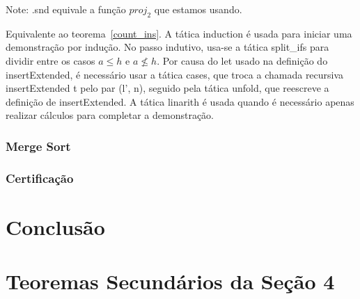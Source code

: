 \documentclass[12pt, oneside, a4paper,english,brazil]{abntex2}
\begin{document}
Note: \textsf{.snd} equivale a fun\c{c}\~ao $proj_{2}$ que estamos usando.

Equivalente ao teorema~\ref{count_ins}. A t\'atica \textsf{induction} \'e usada
 para iniciar uma demonstra\c{c}\~ao por indu\c{c}\~ao. No passo indutivo,
usa-se a t\'atica
\textsf{split\_ifs} para dividir entre os casos \textsf{$a \le h$} e \textsf{$a
\not \le h$}. Por causa do \textsf{let} usado na defini\c{c}\~ao do
\textsf{insertExtended}, \'e necess\'ario usar a t\'atica \textsf{cases},
que troca a chamada recursiva \textsf{insertExtended t} pelo par \textsf{(l',
  n)}, seguido pela t\'atica \textsf{unfold}, que reescreve a defini\c{c}\~ao de
\textsf{insertExtended}. A t\'atica \textsf{linarith} \'e usada quando \'e necess\'ario apenas realizar c\'alculos para completar a demonstra\c{c}\~ao.

\subsection{Merge Sort}

\subsection{Certifica\c{c}\~ao}

\chapter{Conclus\~ao}

\appendixpage
\clearpage
\appendix
\chapter{Teoremas Secund\'arios da Se\c{c}\~ao 4}

\postextual


% 

\end{document}
